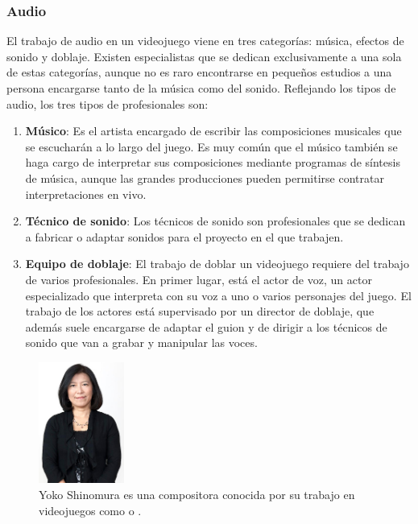 \subsubsection{Audio}
El trabajo de audio en un videojuego viene en tres categorías: música, efectos de sonido y doblaje. Existen especialistas que se dedican exclusivamente a una sola de estas categorías, aunque no es raro encontrarse en pequeños estudios a una persona encargarse tanto de la música como del sonido. Reflejando los tipos de audio, los tres tipos de profesionales son\cite{development_and_production}:
\begin{enumerate}
\item \textbf{Músico}: Es el artista encargado de escribir las composiciones musicales que se escucharán a lo largo del juego. Es muy común que el músico también se haga cargo de interpretar sus composiciones mediante programas de síntesis de música, aunque las grandes producciones pueden permitirse contratar interpretaciones en vivo.
\item \textbf{Técnico de sonido}: Los técnicos de sonido son profesionales que se dedican a fabricar o adaptar sonidos para el proyecto en el que trabajen.
\item \textbf{Equipo de doblaje}: El trabajo de doblar un videojuego requiere del trabajo de varios profesionales. En primer lugar, está el actor de voz, un actor especializado que interpreta con su voz a uno o varios personajes del juego. El trabajo de los actores está supervisado por un director de doblaje, que además suele encargarse de adaptar el guion y de dirigir a los técnicos de sonido que van a grabar y manipular las voces.
\end{enumerate}
\begin{figure}[h]
    \centering
    \includegraphics[width=0.25\textwidth]{images/estadodelarte/desarrollo/yoko-shimomura}
    \caption{Yoko Shinomura es una compositora conocida por su trabajo en videojuegos como  o .}
\end{figure}

